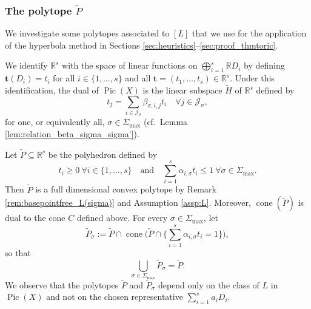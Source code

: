 \documentclass[JEP,XML,SOM,Unicode,published]{cedram}
\newcommand{\bft}{\boldsymbol{t}}
\newcommand\RR{\mathbb{R}}
\newcommand{\ii}[1]{\mathcal{J}_{#1}}
\newcommand{\ic}[1]{\mathcal{I}_{#1}}
\DeclareMathOperator{\cone}{cone}
\DeclareMathOperator{\pic}{Pic}
\theoremstyle{definition}
\numberwithin{theorem}{section}
\begin{document}
\subsubsection{The polytope $\widetilde P$}
We investigate some polytopes associated to $[L]$ that we use for
the application of the hyperbola method
in Sections \ref{sec:heuristics}--\ref{sec:proof_thmtoric}.

We identify $\RR^{s}$ with the space of linear functions on
$\bigoplus_{i=1}^s\RR D_i$ by defining
\hbox{$\bft (D_i)\!=\!t_i$} for all $i\in\{1,\dots,s\}$ and all $\bft=(t_1,\dots,t_s)\in\RR^s$.
Under this identification, the dual of $\pic(X)$ is
the linear subspace $\widetilde H$ of $\RR^{ s }$ defined by
\begin{equation}
\label{eq:dual_picard}
t_{j}
=\sum_{i\in\ic{\sigma}} \beta_{\sigma, i,j}t_i
\quad \forall j\in \ii{\sigma},
\end{equation}
for one, or equivalently all, $\sigma\in\Sigma_{\max}$
(cf.~Lemma \ref{lem:relation_beta_sigma_sigma'}).

Let $\widetilde P \subseteq \RR^{s}$ be the polyhedron
defined by
\begin{equation}
\label{eq:widetildeP}
t_i\geq0 \ \forall i\in\{1,\dots,s\} \quad \text{and} \quad
\sum_{i=1}^s\alpha_{i,\sigma} t_i\leq 1 \
\forall \sigma\in \Sigma_{\max}.
\end{equation}
Then $\widetilde P$ is a full dimensional convex polytope by
Remark \ref{rem:basepointfree_L(sigma)} and Assumption \ref{assp:L}.
Moreover, $\cone(\widetilde P)$ is dual to the cone
$C$ defined above.
For every $\sigma\in\Sigma_{\max}$, let \[
\widetilde P_\sigma:=\widetilde P \cap
\cone \biggl (
\widetilde P\cap \biggl \{
\sum_{i=1}^s\alpha_{i,\sigma} t_i =1
\biggr \} \biggr),
\]
so that
\begin{equation}
\label{eq:widetildeP_union}
\bigcup_{\sigma \in \Sigma_{\max}}\widetilde P_\sigma=\widetilde P.
\end{equation}
We observe that the polytopes $\widetilde P$ and $\widetilde P_\sigma$ depend only
on the class of $L$ in $\pic(X)$ and not on the chosen representative $\sum_{i=1}^s a_i D_i$.
\end{document}
